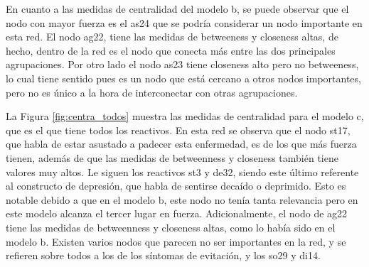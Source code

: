 \documentclass[11pt,spanish]{article}\usepackage[]{graphicx}\usepackage[]{color}
\begin{document}
En cuanto a las medidas de centralidad del modelo b, se puede observar que el nodo con mayor fuerza es el as24 que se podría considerar un nodo importante en esta red. El nodo ag22, tiene las medidas de betweeness y closeness altas, de hecho, dentro de la red es el nodo que conecta más entre las dos principales agrupaciones. Por otro lado el nodo as23 tiene closeness alto pero no betweeness, lo cual tiene sentido pues es un nodo que está cercano a otros nodos importantes, pero no es único a la hora de interconectar con otras agrupaciones. 

La Figura \ref{fig:centra_todos} muestra las medidas de centralidad para el modelo c, que es el que tiene todos los reactivos. En esta red se observa que el nodo st17, que habla de estar asustado a padecer esta enfermedad, es de los que más fuerza tienen, además de que las medidas de betweenness y closeness también tiene valores muy altos. Le siguen los reactivos st3 y de32, siendo este último referente al constructo de depresión, que habla de sentirse decaído o deprimido. Esto es notable debido a que en el modelo b, este nodo no tenía tanta relevancia pero en este modelo alcanza el tercer lugar en fuerza. Adicionalmente, el nodo de ag22 tiene las medidas de betweenness y closeness altas, como lo había sido en el modelo b. Existen varios nodos que parecen no ser importantes en la red, y se refieren sobre todos a los de los síntomas de evitación, y los so29 y di14. 
\end{document}
